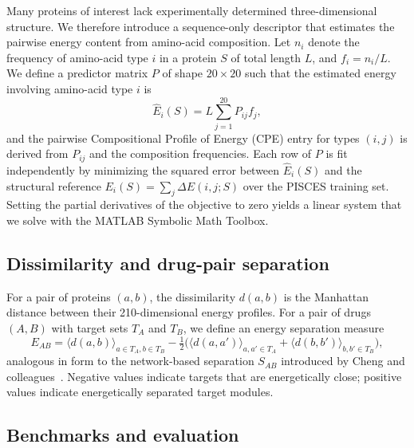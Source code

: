 \documentclass[11pt]{article}
\begin{document}
Many proteins of interest lack experimentally determined three-dimensional
structure. We therefore introduce a sequence-only descriptor that estimates
the pairwise energy content from amino-acid composition. Let $n_i$ denote the
frequency of amino-acid type $i$ in a protein $S$ of total length $L$, and
$f_i = n_i / L$. We define a predictor matrix $P$ of shape $20 \times 20$
such that the estimated energy involving amino-acid type $i$ is
\begin{equation}
  \widehat{E}_i(S) = L \sum_{j=1}^{20} P_{ij} f_j,
  \label{eq:predictor}
\end{equation}
and the pairwise Compositional Profile of Energy (CPE) entry for types
$(i,j)$ is derived from $P_{ij}$ and the composition frequencies. Each row of
$P$ is fit independently by minimizing the squared error between
$\widehat{E}_i(S)$ and the structural reference $E_i(S) = \sum_{j}
\Delta E(i,j;S)$ over the PISCES training set. Setting the partial
derivatives of the objective to zero yields a linear system that we solve
with the MATLAB Symbolic Math Toolbox.

\subsection{Dissimilarity and drug-pair separation}

For a pair of proteins $(a,b)$, the dissimilarity $d(a,b)$ is the Manhattan
distance between their 210-dimensional energy profiles. For a pair of drugs
$(A,B)$ with target sets $T_A$ and $T_B$, we define an energy separation
measure
\begin{equation}
  E_{AB} = \langle d(a,b) \rangle_{a \in T_A, b \in T_B} - \tfrac{1}{2}\big(\langle d(a,a') \rangle_{a,a' \in T_A} + \langle d(b,b') \rangle_{b,b' \in T_B}\big),
  \label{eq:eab}
\end{equation}
analogous in form to the network-based separation $S_{AB}$ introduced by
Cheng and colleagues~\citep{zhou2020network}. Negative values indicate
targets that are energetically close; positive values indicate energetically
separated target modules.

\subsection{Benchmarks and evaluation}
\end{document}

